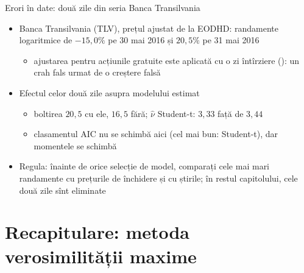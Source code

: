 \begin{frame}{Erori în date: două zile din seria Banca Transilvania}
\itemsize{\small}
\begin{itemize}
    \item Banca Transilvania (TLV), prețul ajustat de la EODHD: randamente logaritmice de $-15{,}0\%$ pe 30 mai 2016 și $20{,}5\%$ pe 31 mai 2016
    \begin{itemize}
        \item ajustarea pentru acțiunile gratuite este aplicată cu o zi întîrziere (): un crah fals urmat de o creștere falsă
    \end{itemize}
    \item Efectul celor două zile asupra modelului estimat
    \begin{itemize}
        \item boltirea $20{,}5$ cu ele, $16{,}5$ fără; $\hat\nu$ Student-t: $3{,}33$ față de $3{,}44$
        \item clasamentul AIC nu se schimbă aici (cel mai bun: Student-t), dar momentele se schimbă
    \end{itemize}
    \item Regula: înainte de orice selecție de model, comparați cele mai mari randamente cu prețurile de închidere și cu știrile; în restul capitolului, cele două zile sînt eliminate
\end{itemize}
\end{frame}


\section{Recapitulare: metoda verosimilității maxime}

